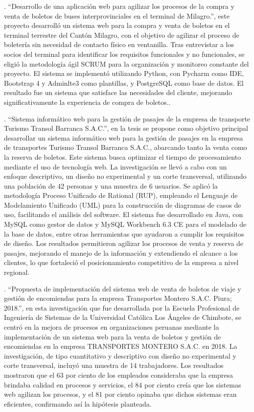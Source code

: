 	\textcite{arevalo2021desarrollo}. ``Desarrollo de una aplicación web para
	agilizar los procesos de la compra y venta de boletos de buses interprovinciales en el terminal de Milagro.'', este proyecto desarrolló un sistema web para la compra y venta de boletos en el terminal terrestre del Cantón Milagro, con el objetivo de agilizar el proceso de boletería sin necesidad de contacto físico en ventanilla. Tras entrevistar a los socios del terminal para identificar los requisitos funcionales y no funcionales, se eligió la metodología ágil SCRUM para la organización y monitoreo constante del proyecto. El sistema se implementó utilizando Python, con Pycharm como IDE, Bootstrap 4 y Adminlte3 como plantillas, y PostgreSQL como base de datos. El resultado fue un sistema que satisface las necesidades del cliente, mejorando significativamente la experiencia de compra de boletos..
	
	\textcite{sosa2019sistema}. ``Sistema informático web para la gestión de pasajes de la empresa de transporte Turismo Transol Barranca S.A.C.'', en la tesis se propone como objetivo principal desarrollar un sistema informático web para la gestión de pasajes en la empresa de transportes Turismo Transol Barranca S.A.C., abarcando tanto la venta como la reserva de boletos. Este sistema busca optimizar el tiempo de procesamiento mediante el uso de tecnología web. La investigación se llevó a cabo con un enfoque descriptivo, un diseño no experimental y un corte transversal, utilizando una población de 42 personas y una muestra de 6 usuarios. Se aplicó la metodología Proceso Unificado de Rational (RUP), empleando el Lenguaje de Modelamiento Unificado (UML) para la construcción de diagramas de casos de uso, facilitando el análisis del software. El sistema fue desarrollado en Java, con MySQL como gestor de datos y MySQL Workbench 6.3 CE para el modelado de la base de datos, entre otras herramientas que ayudaron a cumplir los requisitos de diseño. Los resultados permitieron agilizar los procesos de venta y reserva de pasajes, mejorando el manejo de la información y extendiendo el alcance a los clientes, lo que fortaleció el posicionamiento competitivo de la empresa a nivel regional.
	
	\textcite{vivas2019propuesta}. ``Propuesta de implementación del sistema web de venta de boletos de viaje y gestión de encomiendas para la empresa Transportes Montero S.A.C. Piura; 2018.'', en esta investigación que fue desarrollada por la Escuela Profesional de Ingeniería de Sistemas de la Universidad Católica Los Ángeles de Chimbote, se centró en la mejora de procesos en organizaciones peruanas mediante la implementación de un sistema web para la venta de boletos y gestión de encomiendas en la empresa TRANSPORTES MONTERO S.A.C. en 2018. La investigación, de tipo cuantitativo y descriptivo con diseño no experimental y corte transversal, incluyó una muestra de 14 trabajadores. Los resultados mostraron que el 63 por ciento de los empleados consideraba que la empresa brindaba calidad en procesos y servicios, el 84 por ciento creía que los sistemas web agilizan los procesos, y el 81 por ciento opinaba que dichos sistemas eran eficientes, confirmando así la hipótesis planteada.
	
